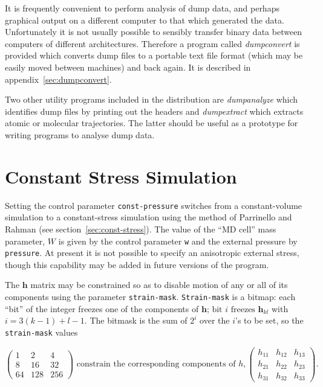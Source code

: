 It is frequently convenient to perform analysis of dump data, and
perhaps graphical output on a different computer to that which
generated the data.  Unfortunately it is not usually possible to
sensibly transfer binary data between computers of different
architectures.  Therefore a program called {\em dumpconvert} is
provided which converts dump files to a portable text file format
(which may be easily moved between machines) and back again. It is
described in appendix~\ref{sec:dumpconvert}.

Two other utility programs included in the distribution are {\em
dumpanalyze} which identifies dump files by printing out the headers
and {\em dumpextract} which extracts atomic or molecular trajectories.
The latter should be useful as a prototype for writing programs to
analyse dump data.

\section{Constant Stress Simulation}

Setting  the control parameter   \verb'const-pressure' switches from a
constant-volume  simulation to a constant-stress  simulation using the
method     of    Parrinello     and    Rahman\cite{parrinello:81}   (see
section~\ref{sec:const-stress}).   The value of  the  ``MD cell'' mass
parameter,  $W$  is given by the control  parameter \verb'w'  and  the
external pressure by \verb'pressure'. At present it is not possible to
specify an anisotropic external stress, though this  capability may be
added in future versions of the program.

\label{sec:cp-constraints}
The $\bm{h}$ matrix may be constrained so as to disable motion of any
or all of its components using the parameter \verb'strain-mask'. 
\verb'Strain-mask' is a bitmap: each ``bit'' of the integer
freezes one of the components of $\bm{h}$;
$\mbox{bit } i \mbox{ freezes } \bm{h}_{kl}$ with 
$ i = 3 (k\!-\!1)\! +\! l\! -\!1$.
The bitmask is the sum of $2^i$ over the $i$'s to be set, so the
\verb`strain-mask` values

\begin{displaymath}
\left (
\begin{array}{rrr}
1 & 2 & 4 \\ 8 & 16 & 32 \\ 64 & 128 & 256
\end{array}
\right )
\mbox{ constrain the corresponding components of }
h, 
\left (
\begin{array}{rrr}
h_{11} & h_{12} & h_{13} \\ h_{21} & h_{22} & h_{23} \\ h_{31} & h_{32} & h_{33}
\end{array}
\right ) .
\end{displaymath}

